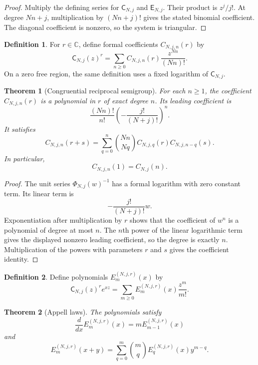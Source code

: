 \documentclass{aomart}
\newtheorem{theorem}{Theorem}[section]
\theoremstyle{definition}
\newtheorem{definition}[definition]{Definition}
\theoremstyle{remark}
\newcommand{\CC}{\mathbb C}
\newcommand{\Efun}{\mathsf E}
\newcommand{\Cfun}{\mathsf C}
\begin{document}
\begin{proof}
Multiply the defining series for $\Cfun_{N,j}$ and $\Efun_{N,j}$.  Their product is $z^j/j!$.  At degree $Nn+j$, multiplication by $(Nn+j)!$ gives the stated binomial coefficient.  The diagonal coefficient is nonzero, so the system is triangular.
\end{proof}

\begin{definition}\label{def:congruential_power}
For $r\in\CC$, define formal coefficients $C_{N,j,n}(r)$ by
\[
\Cfun_{N,j}(z)^r
=
\sum_{n\geq0}C_{N,j,n}(r)\frac{z^{Nn}}{(Nn)!}.
\]
On a zero free region, the same definition uses a fixed logarithm of $\Cfun_{N,j}$.
\end{definition}

\begin{theorem}[Congruential reciprocal semigroup]\label{thm:congruential_semigroup}
For each $n\geq1$, the coefficient $C_{N,j,n}(r)$ is a polynomial in $r$ of exact degree $n$.  Its leading coefficient is
\[
\frac{(Nn)!}{n!}
\left(-\frac{j!}{(N+j)!}\right)^n.
\]
It satisfies
\[
C_{N,j,n}(r+s)
=
\sum_{q=0}^{n}
\binom{Nn}{Nq}
C_{N,j,q}(r)C_{N,j,n-q}(s).
\]
In particular,
\[
C_{N,j,n}(1)=C_{N,j}(n).
\]
\end{theorem}

\begin{proof}
The unit series $\Phi_{N,j}(w)^{-1}$ has a formal logarithm with zero constant term.  Its linear term is
\[
-\frac{j!}{(N+j)!}w.
\]
Exponentiation after multiplication by $r$ shows that the coefficient of $w^n$ is a polynomial of degree at most $n$.  The $n$th power of the linear logarithmic term gives the displayed nonzero leading coefficient, so the degree is exactly $n$.  Multiplication of the powers with parameters $r$ and $s$ gives the coefficient identity.
\end{proof}

\begin{definition}\label{def:block_appell}
Define polynomials $E_m^{(N,j,r)}(x)$ by
\[
\Cfun_{N,j}(z)^re^{xz}
=
\sum_{m\geq0}E_m^{(N,j,r)}(x)\frac{z^m}{m!}.
\]
\end{definition}

\begin{theorem}[Appell laws]\label{thm:appell_laws}
The polynomials satisfy
\[
\frac{d}{dx}E_m^{(N,j,r)}(x)
=
mE_{m-1}^{(N,j,r)}(x)
\]
and
\[
E_m^{(N,j,r)}(x+y)
=
\sum_{q=0}^{m}
\binom mq
E_q^{(N,j,r)}(x)y^{m-q}.
\]
\end{theorem}
\end{document}
